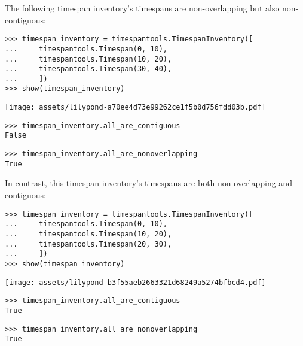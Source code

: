\noindent The following timespan inventory's timespans are non-overlapping but
also non-contiguous:

\begin{comment}
<abjad>
timespan_inventory = timespantools.TimespanInventory([
    timespantools.Timespan(0, 10),
    timespantools.Timespan(10, 20),
    timespantools.Timespan(30, 40),
    ])
show(timespan_inventory)
timespan_inventory.all_are_contiguous
timespan_inventory.all_are_nonoverlapping
</abjad>
\end{comment}

\begin{singlespacing}
\vspace{-0.5\baselineskip}
\begin{lstlisting}
>>> timespan_inventory = timespantools.TimespanInventory([
...     timespantools.Timespan(0, 10),
...     timespantools.Timespan(10, 20),
...     timespantools.Timespan(30, 40),
...     ])
>>> show(timespan_inventory)
\end{lstlisting}
\noindent\texttt{[image: assets/lilypond-a70ee4d73e99262ce1f5b0d756fdd03b.pdf]}
\begin{lstlisting}
>>> timespan_inventory.all_are_contiguous
False
\end{lstlisting}
\begin{lstlisting}
>>> timespan_inventory.all_are_nonoverlapping
True
\end{lstlisting}
\end{singlespacing}

\noindent In contrast, this timespan inventory's timespans are both
non-overlapping and contiguous:

\begin{comment}
<abjad>
timespan_inventory = timespantools.TimespanInventory([
    timespantools.Timespan(0, 10),
    timespantools.Timespan(10, 20),
    timespantools.Timespan(20, 30),
    ])
show(timespan_inventory)
timespan_inventory.all_are_contiguous
timespan_inventory.all_are_nonoverlapping
</abjad>
\end{comment}

\begin{singlespacing}
\vspace{-0.5\baselineskip}
\begin{lstlisting}
>>> timespan_inventory = timespantools.TimespanInventory([
...     timespantools.Timespan(0, 10),
...     timespantools.Timespan(10, 20),
...     timespantools.Timespan(20, 30),
...     ])
>>> show(timespan_inventory)
\end{lstlisting}
\noindent\texttt{[image: assets/lilypond-b3f55aeb2663321d68249a5274bfbcd4.pdf]}
\begin{lstlisting}
>>> timespan_inventory.all_are_contiguous
True
\end{lstlisting}
\begin{lstlisting}
>>> timespan_inventory.all_are_nonoverlapping
True
\end{lstlisting}
\end{singlespacing}

